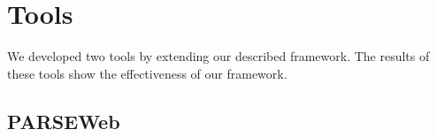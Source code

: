 \documentclass{sigplanconf}
\newcommand{\Comment}[1]{}
\begin{document}
\section{Tools}
\label{sec:extensions}

We developed two tools by extending our described framework. The results of these tools
show the effectiveness of our framework.
\Comment{PARSEWeb takes queries of the form ``\emph{Source Object Type} $\rightarrow$
\emph{Destination Object Type}'' as input and suggests frequent method-invocation
sequences that can take the \emph{Source Object Type} as input
and result in the \emph{Destination Object Type}. The second tool, called Hotspotter,
extends the described framework for identifying usage hotspots and weakspots in the library or framework given as input.}
\subsection{PARSEWeb}
\label{sec:parseweb}
\end{document}
